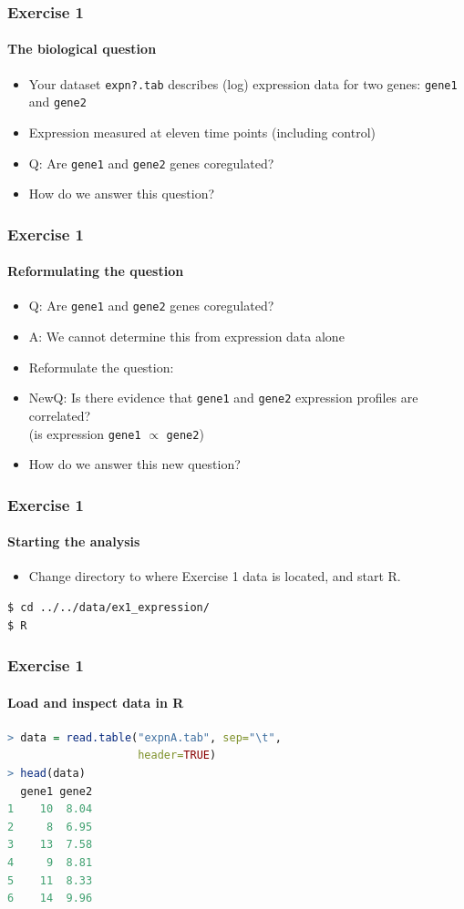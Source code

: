 \documentclass[table]{beamer}
\begin{document}
  \begin{frame}
    \frametitle{Exercise 1}
    \framesubtitle{The biological question}
    \begin{itemize}
      \item Your dataset \texttt{expn?.tab} describes (log) expression data for two genes: \texttt{gene1} and \texttt{gene2}
      \item Expression measured at eleven time points (including control)
      \item Q: Are \texttt{gene1} and \texttt{gene2} genes coregulated?
      \item How do we answer this question?
    \end{itemize}
  \end{frame}  

  \begin{frame}
    \frametitle{Exercise 1}
    \framesubtitle{Reformulating the question}
    \begin{itemize}
      \item<1-> Q: Are \texttt{gene1} and \texttt{gene2} genes coregulated?
      \item<1-> A: We cannot determine this from expression data alone
      \item<2-> Reformulate the question:
      \item<2-> NewQ: Is there evidence that \texttt{gene1} and \texttt{gene2} expression profiles are correlated? \\
            (is expression \texttt{gene1} $\propto$ \texttt{gene2})
      \item<2-> How do we answer this new question?
    \end{itemize}
  \end{frame}

  \begin{frame}[fragile]
    \frametitle{Exercise 1}
    \framesubtitle{Starting the analysis}
    \begin{itemize}
      \item Change directory to where Exercise 1 data is located, and start R.
    \end{itemize}
    \begin{lstlisting}[language=bash]
$ cd ../../data/ex1_expression/
$ R
    \end{lstlisting}
\end{frame}

  \begin{frame}[fragile]
    \frametitle{Exercise 1}
    \framesubtitle{Load and inspect data in R}
    \begin{lstlisting}[language=R]
> data = read.table("expnA.tab", sep="\t", 
                    header=TRUE)
> head(data)
  gene1 gene2
1    10  8.04
2     8  6.95
3    13  7.58
4     9  8.81
5    11  8.33
6    14  9.96
    \end{lstlisting}
\end{frame}
\end{document}
